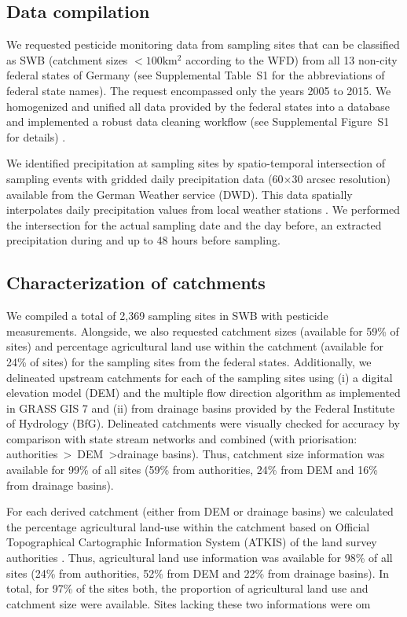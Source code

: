 \documentclass[journal=esthag,manuscript=article]{achemso}
\begin{document}
\subsection{Data compilation}
We requested pesticide monitoring data from sampling sites that can be classified as SWB (catchment sizes $\mathrm{< 100km^2}$ according to the WFD) from all 13 non-city federal states of Germany (see Supplemental Table~S1 for the abbreviations of federal state names). 
The request encompassed only the years 2005 to 2015.
We homogenized and unified all data provided by the federal states into a database and implemented a robust data cleaning workflow (see Supplemental Figure~S1 for details) \citep{poisot_best_2015}.

We identified precipitation at sampling sites by spatio-temporal intersection of sampling events with gridded daily precipitation data (60$\times$30 arcsec resolution) available from the German Weather service (DWD).
This data spatially interpolates daily precipitation values from local weather stations \citep{rauthe_central_2013}. 
We performed the intersection for the actual sampling date and the day before, an extracted precipitation during and up to 48 hours before sampling. 


\subsection{Characterization of catchments}
We compiled a total of 2,369 sampling sites in SWB with pesticide measurements. %
Alongside, we also requested catchment sizes (available for 59\% of sites) and percentage agricultural land use within the catchment (available for 24\% of sites) for the sampling sites from the federal states. %
Additionally, we delineated upstream catchments for each of the sampling sites using (i) a digital elevation model (DEM) \citep{eea_digital_2013} and the multiple flow direction algorithm \citep{holmgren_multiple_1994} as implemented in GRASS GIS 7 \citep{neteler_grass_2012} and (ii) from drainage basins provided by the Federal Institute of Hydrology (BfG).
Delineated catchments were visually checked for accuracy by comparison with state stream networks and combined (with priorisation: authorities~\textgreater~DEM~\textgreater drainage basins).
Thus, catchment size information was available for 99\% of all sites (59\% from authorities, 24\% from DEM and 16\% from drainage basins). 

For each derived catchment (either from DEM or drainage basins) we calculated the percentage agricultural land-use within the catchment based on Official Topographical Cartographic Information System (ATKIS) of the land survey authorities \citep{adv_atkis_2016}. 
Thus, agricultural land use information was available for 98\% of all sites (24\% from authorities, 52\% from DEM and 22\% from drainage basins). 
In total, for 97\% of the sites both, the proportion of agricultural land use and catchment size were available. 
Sites lacking these two informations were om 
\end{document}

